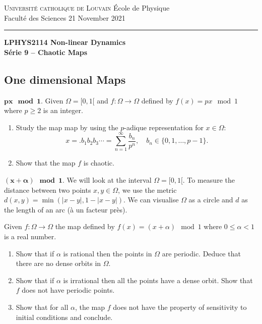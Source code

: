 \documentclass{article}
\begin{document}
\noindent
{\textsc{Universit\'e catholique de Louvain}} \hfill \'Ecole de Physique\\
Facult\'e des Sciences \hfill 21 November 2021\\
\hrule

\bigskip

\begin{center}
  \textbf{LPHYS2114 Non-linear Dynamics}\\
  \textbf{S\'erie 9 -- Chaotic Maps} 
\end{center}

{}

\subsection*{One dimensional Maps}

\begin{question}
  $\bm{p x \mod 1}  $. Given $\Omega = [0,1[$ and $f:\Omega \to \Omega$ defined by $f(x) = px \mod 1$ where $p\geqslant 2$ is an integer.
  \begin{enumerate}[label=(\alph*)]
    \item Study the map map by using the $p$-adique representation for $x\in \Omega$:
    \begin{equation}
      x = .b_1b_2b_3\cdots = \sum_{n=1}^\infty \frac{b_n}{p^n}, \quad b_n\in \{0,1,\dots,p-1\}.
    \end{equation}
    \item Show that the map $f$ is chaotic.
  \end{enumerate}
\end{question}

\begin{question}
  \textbf{} $\bm{(x+\alpha) \mod 1}  $. We will look at the interval $\Omega = [0,1[$. To measure the distance between two points $x,y\in \Omega$, we use the metric $d(x,y) = \min(|x-y|,1-|x-y|)$. We can visualise $\Omega$ as a circle and $d$ as the length of an arc (\`a un facteur pr\`es).
  
  \medskip
  \noindent Given $f:\Omega \to \Omega$ the map defined by $f(x) = (x+\alpha) \mod 1$ where $0\leqslant \alpha < 1$ is a real number.
  \begin{enumerate}[label=(\alph*)]
    \item Show that if $\alpha$ is rational then the points in $\Omega$ are periodic. Deduce that there are no dense orbits in $\Omega$.
    \item Show that if $\alpha$ is irrational then all the points have a dense orbit. Show that $f$ does not have periodic points.
    \item Show that for all $\alpha$, the map $f$ does not have the property of sensitivity to initial conditions and conclude.
  \end{enumerate}
\end{question}
\end{document}
